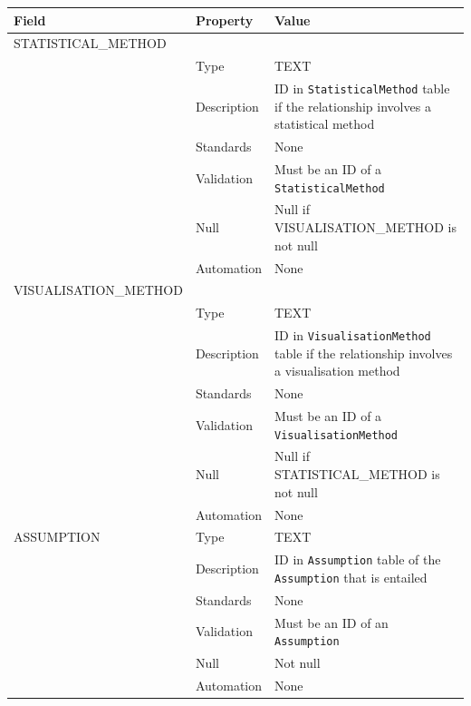 \documentclass[
]{article}
\newcounter{none} %
\begin{document}
{\def\LTcaptype{none} %
\begin{longtable}[]{@{}
  >{\raggedright\arraybackslash}p{}
  >{\raggedright\arraybackslash}p{}
  >{\raggedright\arraybackslash}p{}@{}}
\toprule\noalign{}
\begin{minipage}[b]{\linewidth}\raggedright
Field
\end{minipage} & \begin{minipage}[b]{\linewidth}\raggedright
Property
\end{minipage} & \begin{minipage}[b]{\linewidth}\raggedright
Value
\end{minipage} \\
\midrule\noalign{}
\endhead
\bottomrule\noalign{}
\endlastfoot
STATISTICAL\_METHOD & & \\
& Type & TEXT \\
& Description & ID in \texttt{StatisticalMethod} table if the
relationship involves a statistical method \\
& Standards & None \\
& Validation & Must be an ID of a \texttt{StatisticalMethod} \\
& Null & Null if VISUALISATION\_METHOD is not null \\
& Automation & None \\
VISUALISATION\_METHOD & & \\
& Type & TEXT \\
& Description & ID in \texttt{VisualisationMethod} table if the
relationship involves a visualisation method \\
& Standards & None \\
& Validation & Must be an ID of a \texttt{VisualisationMethod} \\
& Null & Null if STATISTICAL\_METHOD is not null \\
& Automation & None \\
ASSUMPTION & Type & TEXT \\
& Description & ID in \texttt{Assumption} table of the
\texttt{Assumption} that is entailed \\
& Standards & None \\
& Validation & Must be an ID of an \texttt{Assumption} \\
& Null & Not null \\
& Automation & None \\
\end{longtable}
}
\end{document}
